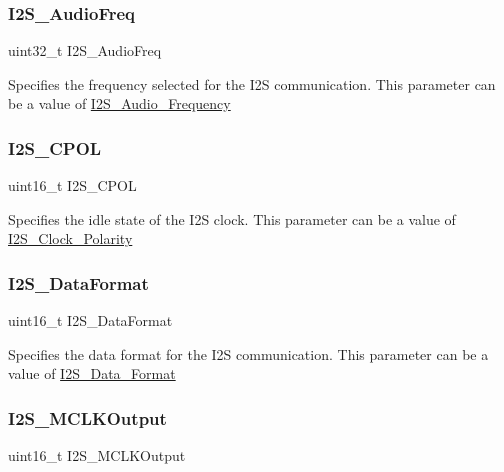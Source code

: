 \subsubsection{\texorpdfstring{I2S\_AudioFreq}{I2S\_AudioFreq}}
{\footnotesize\ttfamily uint32\+\_\+t I2\+S\+\_\+\+Audio\+Freq}

Specifies the frequency selected for the I2S communication. This parameter can be a value of \mbox{\hyperlink{group___i2_s___audio___frequency}{I2\+S\+\_\+\+Audio\+\_\+\+Frequency}} \mbox{\label{struct_i2_s___init_type_def_a948d79d6388454da8459fea27c338900}} 
\subsubsection{\texorpdfstring{I2S\_CPOL}{I2S\_CPOL}}
{\footnotesize\ttfamily uint16\+\_\+t I2\+S\+\_\+\+C\+P\+OL}

Specifies the idle state of the I2S clock. This parameter can be a value of \mbox{\hyperlink{group___i2_s___clock___polarity}{I2\+S\+\_\+\+Clock\+\_\+\+Polarity}} \mbox{\label{struct_i2_s___init_type_def_a5d36bbd1f2aa29414ae1d25c3cc0d66c}} 
\subsubsection{\texorpdfstring{I2S\_DataFormat}{I2S\_DataFormat}}
{\footnotesize\ttfamily uint16\+\_\+t I2\+S\+\_\+\+Data\+Format}

Specifies the data format for the I2S communication. This parameter can be a value of \mbox{\hyperlink{group___i2_s___data___format}{I2\+S\+\_\+\+Data\+\_\+\+Format}} \mbox{\label{struct_i2_s___init_type_def_a4e49b94b867428b8abf8e5385fb0879d}} 
\subsubsection{\texorpdfstring{I2S\_MCLKOutput}{I2S\_MCLKOutput}}
{\footnotesize\ttfamily uint16\+\_\+t I2\+S\+\_\+\+M\+C\+L\+K\+Output}

